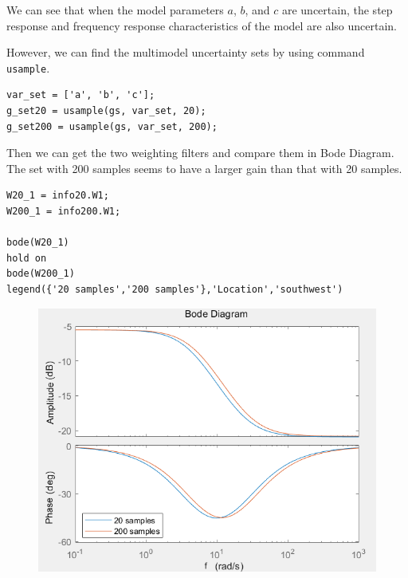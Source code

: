 \documentclass{article}
\begin{document}
We can see that when the model parameters $a$, $b$, and $c$ are uncertain, the step response and frequency response characteristics of the model are also uncertain.

However, we can find the multimodel uncertainty sets by using command \verb|usample|.

\begin{lstlisting}
var_set = ['a', 'b', 'c'];
g_set20 = usample(gs, var_set, 20);
g_set200 = usample(gs, var_set, 200);
\end{lstlisting}

Then we can get the two weighting filters and compare them in Bode Diagram. The set with 200 samples seems to have a larger gain than that with 20 samples.
\begin{lstlisting}
W20_1 = info20.W1;
W200_1 = info200.W1;

bode(W20_1)
hold on
bode(W200_1)
legend({'20 samples','200 samples'},'Location','southwest')
\end{lstlisting}

\begin{figure}[h]
    \centering
    \includegraphics[width=0.45\linewidth]{1_3_ucover.png}
\end{figure}
\end{document}
